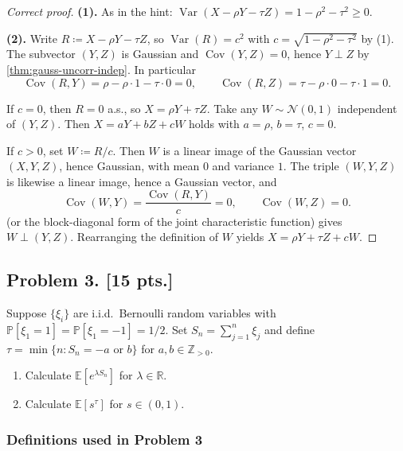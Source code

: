 \documentclass[11pt,a4paper]{article}
\DeclareMathOperator{\Var}{Var}
\begin{document}
\begin{proof}[Correct proof]
\textbf{(1).}
As in the hint: \( \Var(X-\rho Y-\tau Z)=1-\rho^{2}-\tau^{2}\ge 0 \).

\textbf{(2).}
Write \( R\coloneqq X-\rho Y-\tau Z \), so \( \Var(R)=c^{2} \) with \( c=\sqrt{1-\rho^{2}-\tau^{2}} \) by (1). The subvector \( (Y,Z) \) is Gaussian and \( \operatorname{Cov}(Y,Z)=0 \), hence \( Y\perp Z \) by \cref{thm:gauss-uncorr-indep}. In particular
\[
\operatorname{Cov}(R,Y)
=
\rho-\rho\cdot 1-\tau\cdot 0
=
0,
\qquad
\operatorname{Cov}(R,Z)
=
\tau-\rho\cdot 0-\tau\cdot 1
=
0.
\]

If \( c=0 \), then \( R=0 \) a.s., so \( X=\rho Y+\tau Z \). Take any \( W\sim\mathcal{N}(0,1) \) independent of \( (Y,Z) \). Then \( X=aY+bZ+cW \) holds with \( a=\rho \), \( b=\tau \), \( c=0 \).

If \( c>0 \), set \( W\coloneqq R/c \). Then \( W \) is a linear image of the Gaussian vector \( (X,Y,Z) \), hence Gaussian, with mean \( 0 \) and variance \( 1 \). The triple \( (W,Y,Z) \) is likewise a linear image, hence a Gaussian vector, and
\[
\operatorname{Cov}(W,Y)
=
\frac{\operatorname{Cov}(R,Y)}{c}
=
0,
\qquad
\operatorname{Cov}(W,Z)
=
0.
\]
 (or the block-diagonal form of the joint characteristic function) gives \( W\perp(Y,Z) \). Rearranging the definition of \( W \) yields \( X=\rho Y+\tau Z+cW \).
\end{proof}

\subsection{Problem 3. [15 pts.]}
Suppose \( \{\xi_i\} \) are i.i.d.\ Bernoulli random variables with \( \mathbb{P}[\xi_1 = 1] = \mathbb{P}[\xi_1 = -1] = 1/2 \). Set \( S_n = \sum_{j=1}^n \xi_j \) and define \( \tau = \min\{n : S_n = -a \text{ or } b\} \) for \( a, b \in \mathbb{Z}_{>0} \).
\begin{enumerate}[label=(\arabic*)]
    \item Calculate \( \mathbb{E}[e^{\lambda S_n}] \) for \( \lambda \in \mathbb{R} \).
    \item Calculate \( \mathbb{E}[s^\tau] \) for \( s \in (0, 1) \).
\end{enumerate}

\setcounter{section}{3}

\subsubsection{Definitions used in Problem 3}
\end{document}
